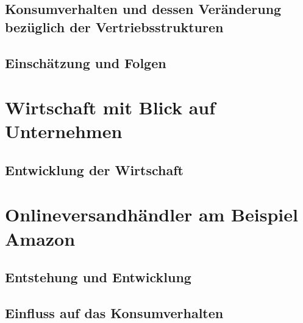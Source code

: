 \documentclass[a4paper, 12pt]{scrartcl}
\begin{document}
        \subsection{Konsumverhalten und dessen Veränderung bezüglich der Vertriebsstrukturen}
            
            
        \subsection{Einschätzung und Folgen}
            
        \newpage
            
            
            
    \section{Wirtschaft mit Blick auf Unternehmen}
            
        \subsection{Entwicklung der Wirtschaft}
            
        \newpage
        
        
        
    \section{Onlineversandhändler am Beispiel Amazon} 
        
        \subsection{Entstehung und Entwicklung}
            
            
        \subsection{Einfluss auf das Konsumverhalten } %
            
        \newpage
            
\end{document}
